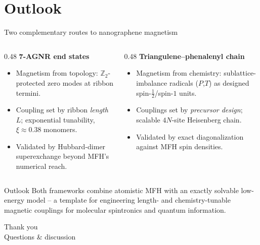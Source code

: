 \documentclass[aspectratio=169,11pt]{beamer}
\begin{document}
\section{Outlook}

\begin{frame}{Two complementary routes to nanographene magnetism}
  \small
  \begin{columns}[t]
    \begin{column}{0.48\textwidth}
      \textbf{7-AGNR end states}
      \begin{itemize}
        \item Magnetism from topology: $\mathbb Z_2$-protected zero modes at ribbon termini.
        \item Coupling set by ribbon \emph{length} $L$; exponential tunability, $\xi\approx0.38$ monomers.
        \item Validated by Hubbard-dimer superexchange beyond MFH's numerical reach.
      \end{itemize}
    \end{column}
    \begin{column}{0.48\textwidth}
      \textbf{Triangulene--phenalenyl chain}
      \begin{itemize}
        \item Magnetism from chemistry: sublattice-imbalance radicals ($P$,$T$) as designed spin-$\tfrac12$/spin-$1$ units.
        \item Couplings set by \emph{precursor design}; scalable $4N$-site Heisenberg chain.
        \item Validated by exact diagonalization against MFH spin densities.
      \end{itemize}
    \end{column}
  \end{columns}
  \vspace{2mm}
  \begin{block}{Outlook}
    \small Both frameworks combine atomistic MFH with an exactly solvable low-energy model -- a template for engineering length- and chemistry-tunable magnetic couplings for molecular spintronics and quantum information.
  \end{block}
\end{frame}

\begin{frame}[standout]
  Thank you\\
  \vspace{2mm}
  {\large Questions \& discussion}
\end{frame}
\end{document}
